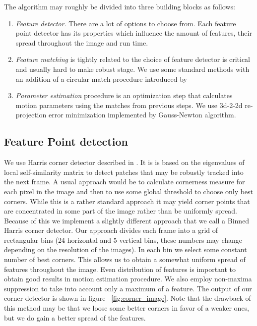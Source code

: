 \documentclass[10pt]{article}         %
\begin{document}
The algorithm may roughly be divided into three building blocks as follows:
\begin{enumerate}
\item \emph{Feature detector}. There are a lot of options to choose from.  Each feature point detector has its properties which influence the amount of features, their spread throughout the image and run time.
\item \emph{Feature matching} is tightly related to the choice of feature detector is critical and usually hard to make robust stage.  We use some standard methods with an addition of a circular match procedure introduced by \cite{Geiger2011IV}
\item \emph{Parameter estimation} procedure is an optimization step that calculates motion parameters using the matches from previous steps.  We use 3d-2-2d re-projection error minimization implemented by Gauss-Newton algorithm.
\end{enumerate}

\subsection{Feature Point detection}
We use Harris corner detector described in \cite{Harris88acombined}. It is is based on the eigenvalues of local self-similarity matrix to detect patches that may be robustly tracked into the next frame.  A usual approach would be to calculate cornerness measure for each pixel in the image and then to use some global threshold to choose only best corners.  While this is a rather standard approach it may yield corner points that are concentrated in some part of the image rather than be uniformly spread.  Because of this we implement a slightly different approach that we call a Binned Harris corner detector. Our approach divides each frame into a grid of rectangular bins (24 horizontal and 5 vertical bins, these numbers may change depending on the resolution of the images).  In each bin we select some constant number of best corners.  This allows us to obtain a somewhat uniform spread of features throughout the image. Even distribution of features is important to obtain good results in motion estimation procedure.  We also employ non-maxima suppression to take into account only a maximum of a feature. The output of our corner detector is shown in figure ~\ref{fig:corner_image}. Note that the drawback of this method may be that we loose some better corners in favor of a weaker ones, but we do gain a better spread of the features.
\end{document}
